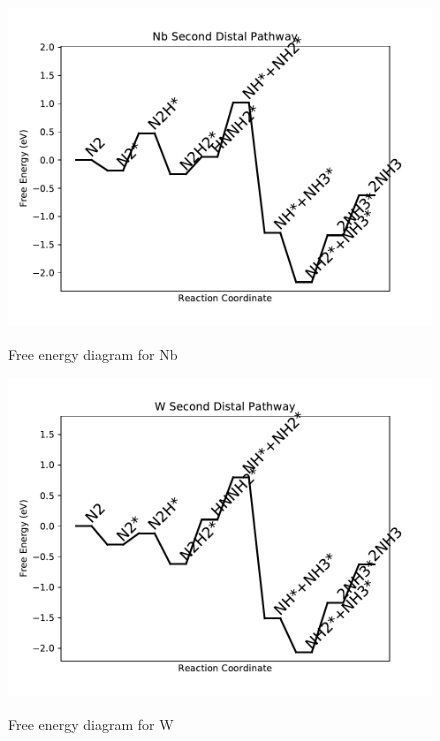 \documentclass{article}
\begin{document}
\newpage
\begin{figure}
\includegraphics[width=1\linewidth]{data/plots/Nb_distal_2.pdf}
\label{fig:Nb_distal_2}
\caption{Free energy diagram for Nb}
\end{figure}

\begin{figure}
\includegraphics[width=1\linewidth]{data/plots/W_distal_2.pdf}
\label{fig:W_distal_2}
\caption{Free energy diagram for W}
\end{figure}
\end{document}
